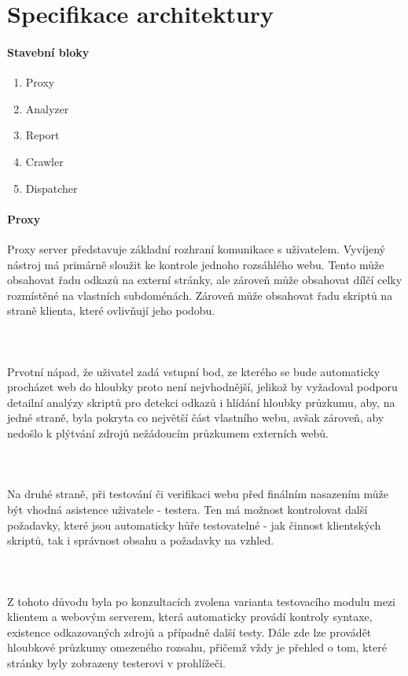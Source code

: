 \documentclass[10pt]{article}
\begin{document}
	\section{Specifikace architektury}
	\paragraph{Stavebn\'i bloky}
	\begin{enumerate}
		\item Proxy
		\item Analyzer
		\item Report
		\item Crawler
		\item Dispatcher
	\end{enumerate}
	\paragraph{Proxy} Proxy server představuje základní rozhraní komunikace s uživatelem. Vyvíjený nástroj má primárně sloužit ke kontrole jednoho rozsáhlého webu. Tento může obsahovat řadu odkazů na externí stránky, ale zároveň může obsahovat dílčí celky rozmístěné na vlastních subdoménách. Zároveň může obsahovat řadu skriptů na straně klienta, které ovlivňují jeho podobu.
	\paragraph{~} Prvotní nápad, že uživatel zadá vstupní bod, ze kterého se bude automaticky procházet web do hloubky proto není nejvhodnější, jelikož by vyžadoval podporu detailní analýzy skriptů pro detekci odkazů i hlídání hloubky průzkumu, aby, na jedné straně, byla pokryta co největší část vlastního webu, avšak zároveň, aby nedošlo k plýtvání zdrojů nežádoucím průzkumem externích webů.
	\paragraph{~} Na druhé straně, při testování či verifikaci webu před finálním nasazením může být vhodná asistence uživatele - testera. Ten má možnost kontrolovat další požadavky, které jsou automaticky hůře testovatelné - jak činnost klientských skriptů, tak i správnost obsahu a požadavky na vzhled.
	\paragraph{~} Z tohoto důvodu byla po konzultacích zvolena varianta testovacího modulu mezi klientem a webovým serverem, která automaticky provádí kontroly syntaxe, existence odkazovaných zdrojů a případně další testy. Dále zde lze provádět hloubkové průzkumy omezeného rozsahu, přičemž vždy je přehled o tom, které stránky byly zobrazeny testerovi v prohlížeči.
\end{document}
